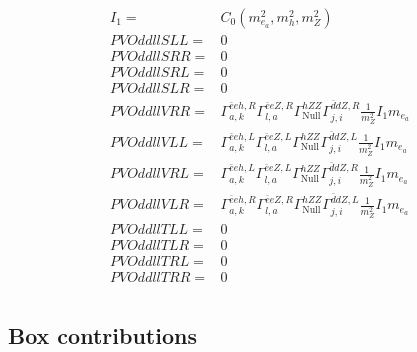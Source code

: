\documentclass[A4,landscape]{article}
\begin{document}
\begin{align} 
I_1= & C_0(m^2_{e_{{a}}}, m^2_{h}, m^2_{Z}) \\ 
  PVOddllSLL= & 0 \\ 
  PVOddllSRR= & 0 \\ 
  PVOddllSRL= & 0 \\ 
  PVOddllSLR= & 0 \\ 
  PVOddllVRR= &  \Gamma^{\bar{e}e h ,R}_{a, k} \Gamma^{\bar{e}e Z ,R}_{l, a} \Gamma^{h Z Z }_\text{Null} \Gamma^{\bar{d}d Z ,R}_{j, i} \frac{1}{m^2_{Z}} I_1 m_{e_{{a}}} \\ 
  PVOddllVLL= &  \Gamma^{\bar{e}e h ,L}_{a, k} \Gamma^{\bar{e}e Z ,L}_{l, a} \Gamma^{h Z Z }_\text{Null} \Gamma^{\bar{d}d Z ,L}_{j, i} \frac{1}{m^2_{Z}} I_1 m_{e_{{a}}} \\ 
  PVOddllVRL= &  \Gamma^{\bar{e}e h ,L}_{a, k} \Gamma^{\bar{e}e Z ,L}_{l, a} \Gamma^{h Z Z }_\text{Null} \Gamma^{\bar{d}d Z ,R}_{j, i} \frac{1}{m^2_{Z}} I_1 m_{e_{{a}}} \\ 
  PVOddllVLR= &  \Gamma^{\bar{e}e h ,R}_{a, k} \Gamma^{\bar{e}e Z ,R}_{l, a} \Gamma^{h Z Z }_\text{Null} \Gamma^{\bar{d}d Z ,L}_{j, i} \frac{1}{m^2_{Z}} I_1 m_{e_{{a}}} \\ 
  PVOddllTLL= & 0 \\ 
  PVOddllTLR= & 0 \\ 
  PVOddllTRL= & 0 \\ 
  PVOddllTRR= & 0 \\ 
\end{align} 
\subsection{Box contributions} 
\end{document}
